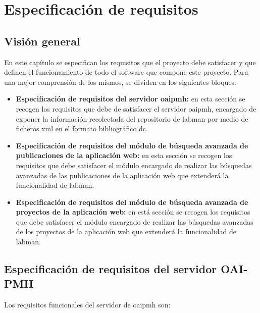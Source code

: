 \chapter{Especificación de requisitos}

\section{Visión general}

En este capítulo se especifican los requisitos que el proyecto debe satisfacer y que definen el funcionamiento de todo el software que compone este proyecto. Para una mejor comprensión de los mismos, se dividen en los siguientes bloques:

\begin{itemize}
	\item \textbf{Especificación de requisitos del servidor \acrshort{oaipmh}:} en esta sección se recogen los requisitos que debe de satisfacer el servidor \acrshort{oaipmh}, encargado de exponer la información recolectada del repositorio de \acrshort{labman} por medio de ficheros \acrshort{xml} en el formato bibliográfico \acrshort{dc}.

	\item \textbf{Especificación de requisitos del módulo de búsqueda avanzada de publicaciones de la aplicación web:} en esta sección se recogen los requisitos que debe satisfacer el módulo encargado de realizar las búsquedas avanzadas de las publicaciones de la aplicación web que extenderá la funcionalidad de \acrshort{labman}.

	\item \textbf{Especificación de requisitos del módulo de búsqueda avanzada de proyectos de la aplicación web:} en está sección se recogen los requisitos que debe satisfacer el módulo encargado de realizar las búsquedas avanzadas de los proyectos de la aplicación web que extenderá la funcionalidad de \acrshort{labman}.
\end{itemize}

\section{Especificación de requisitos del servidor OAI-PMH}

Los requisitos funcionales del servidor de \acrshort{oaipmh} son:

